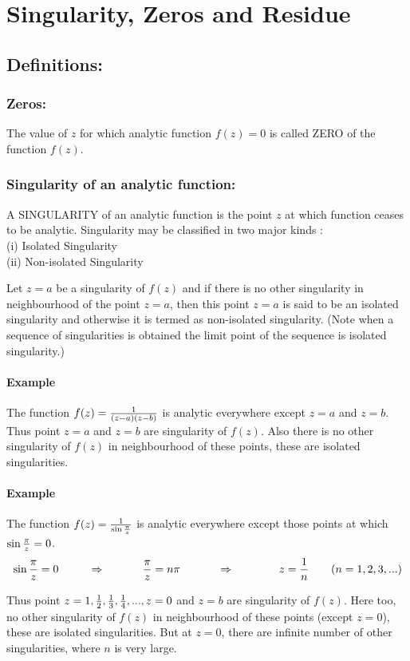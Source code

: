 \chapter{Singularity, Zeros and Residue}
\section{Definitions:}
\subsection{Zeros:}
The value of $z$ for which analytic function $f(z) = 0$ is called ZERO of the function $f(z)$.
\subsection{Singularity of an analytic function:}
A SINGULARITY of an analytic function is the point $z$ at which function ceases to be analytic. Singularity may be classified in two major kinds : \\
(i) Isolated Singularity \\
(ii) Non-isolated Singularity

Let $z=a$ be a singularity of $f(z)$ and if there is no other  singularity in neighbourhood of the point $z=a$, then this point $z=a$ is said to be an isolated singularity and otherwise it is termed as non-isolated singularity. (Note when a sequence of singularities is obtained the limit point of the sequence is isolated singularity.)
\subsubsection{Example}
The function $f(z) = {1 \over (z-a)(z-b)}$ is analytic everywhere except $z=a$ and $z=b$. Thus point $z= a$ and $z=b$ are singularity of $f(z)$. Also there is no other singularity of $f(z)$ in neighbourhood of these points, these are isolated singularities.
\subsubsection{Example}
The function $f(z) = {1 \over \sin {\pi \over z}}$ is analytic everywhere except those points at which $\sin {\pi \over z} = 0$.
\[\sin {\pi \over z} = 0~~~~~~~~\Rightarrow~~~~~~~~~~{\pi \over z} = n \pi ~~~~~~~~~~\Rightarrow~~~~~~~~~~~~ z = {1 \over n} ~~~~~~(n = 1, 2, 3, ...)\]

 Thus point $z= 1, {1 \over 2}, {1 \over 3}, {1 \over 4}, ..., z=0$ and $z=b$ are singularity of $f(z)$. Here too, no other singularity of $f(z)$ in neighbourhood of these points (except $z=0$), these are isolated singularities. But at $z=0$, there are infinite number of other singularities, where $n$ is very large.
